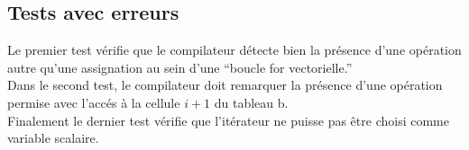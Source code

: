 \documentclass[a4paper,8pt,french,fleqn]{report}
\begin{document}
\subsection*{Tests avec erreurs}

Le premier test vérifie que le compilateur détecte bien la présence d'une opération autre qu'une assignation au sein d'une ``boucle for vectorielle.'' \\

Dans le second test, le compilateur doit remarquer la présence d'une opération permise avec l'accés à la cellule $i + 1$ du tableau b. \\

Finalement le dernier test vérifie que l'itérateur ne puisse pas être choisi comme variable scalaire.
\end{document}
